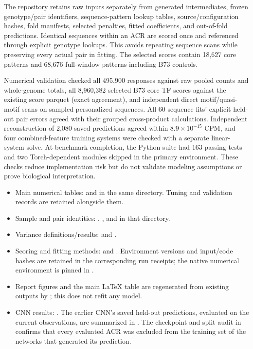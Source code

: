 \documentclass[10pt]{article}
\begin{document}
The repository retains raw inputs separately from generated intermediates, frozen genotype/pair identifiers, sequence-pattern lookup tables, source/configuration hashes, fold manifests, selected penalties, fitted coefficients, and out-of-fold predictions. Identical sequences within an ACR are scored once and referenced through explicit genotype lookups. This avoids repeating sequence scans while preserving every actual pair in fitting. The selected scores contain 18,627 core patterns and 68,676 full-window patterns including B73 controls.

Numerical validation checked all 495,900 responses against raw pooled counts and whole-genome totals, all 8,960,382 selected B73 core TF scores against the existing score parquet (exact agreement), and independent direct motif/quasi-motif scans on sampled personalized sequences. All 60 sequence fits' explicit held-out pair errors agreed with their grouped cross-product calculations. Independent reconstruction of 2,080 saved predictions agreed within $8.9\times10^{-15}$ CPM, and four combined-feature training systems were checked with a separate linear-system solve. At benchmark completion, the Python suite had 163 passing tests and two Torch-dependent modules skipped in the primary environment. These checks reduce implementation risk but do not validate modeling assumptions or prove biological interpretation.

\begin{itemize}
\item Main numerical tables:  and  in the same directory. Tuning and validation records are retained alongside them.
\item Sample and pair identities: , , and  in that directory.
\item Variance definitions/results:  and .
\item Scoring and fitting methods:  and . Environment versions and input/code hashes are retained in the corresponding run receipts; the native numerical environment is pinned in .
\item Report figures and the main LaTeX table are regenerated from existing outputs by ; this does not refit any model.
\item CNN results: .
The earlier CNN's saved held-out predictions, evaluated on the
current observations, are summarized in
.
The checkpoint and split audit in
confirms that every evaluated ACR was excluded from the training
set of the networks that generated its prediction.
\end{itemize}
\end{document}
